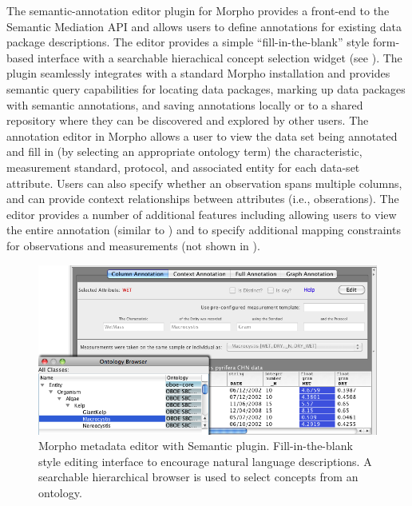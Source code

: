 
  The semantic-annotation editor
plugin for Morpho provides a front-end to the Semantic Mediation API
and allows users to define annotations for existing data package
descriptions. The editor provides a simple ``fill-in-the-blank'' style
form-based interface with a searchable hierachical concept selection
widget (see ). The plugin seamlessly
integrates with a standard Morpho installation and provides semantic
query capabilities for locating data packages, marking up data
packages with semantic annotations, and saving annotations locally or
to a shared repository where they can be discovered and explored by
other users. The annotation editor in Morpho allows a user to view the
data set being annotated and fill in (by selecting an appropriate
ontology term) the characteristic, measurement standard, protocol, and
associated entity for each data-set attribute. Users can also specify
whether an observation spans multiple columns, and can provide context
relationships between attributes (i.e., obserations). The editor
provides a number of additional features including allowing users to
view the entire annotation (similar to )
and to specify additional mapping constraints for observations and
measurements (not shown in ).

\begin{figure}
\centering
\includegraphics[width=1.0\textwidth]{images/morpho-annotation-widget.png}
\caption{Morpho metadata editor with Semantic
  plugin. Fill-in-the-blank style editing interface to encourage
  natural language descriptions. A searchable hierarchical browser is
  used to select concepts from an ontology.}
\label{fig:morpho-annotation}
\end{figure}

